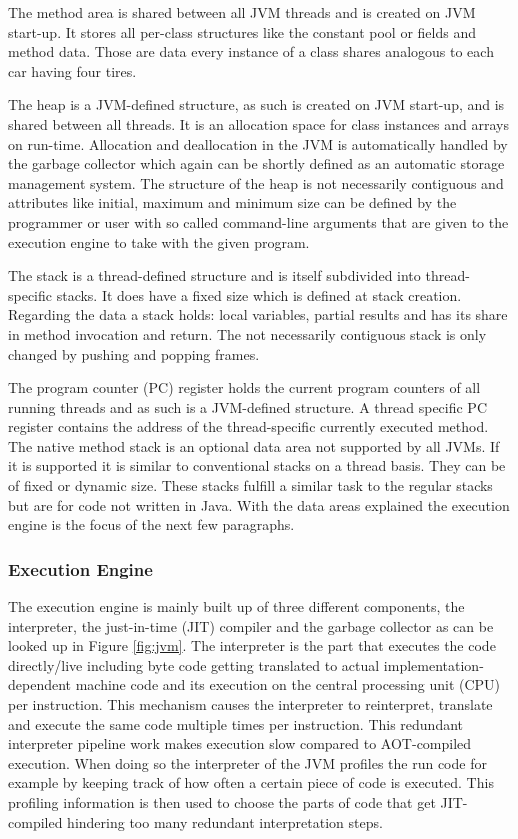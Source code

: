 The method area is shared between all JVM threads and is created on JVM start-up. It stores all per-class structures like the constant pool or fields and method data. Those are data every instance of a class shares analogous to each car having four tires.

The heap is a JVM-defined structure, as such is created on JVM start-up, and is shared between all threads. It is an allocation space for class instances and arrays on run-time. Allocation and deallocation in the JVM is automatically handled by the garbage collector which again can be shortly defined as an automatic storage management system. The structure of the heap is not necessarily contiguous and attributes like initial, maximum and minimum size can be defined by the programmer or user with so called command-line arguments that are given to the execution engine to take with the given program.

The stack is a thread-defined structure and is itself subdivided into thread-specific stacks. It does have a fixed size which is defined at stack creation. Regarding the data a stack holds: local variables, partial results and has its share in method invocation and return. The not necessarily contiguous stack is only changed by pushing and popping frames.

The program counter (PC) register holds the current program counters of all running threads and as such is a JVM-defined structure. A thread specific PC register contains the address of the thread-specific currently executed method.
The native method stack is an optional data area not supported by all JVMs. If it is supported it is similar to conventional stacks on a thread basis. They can be of fixed or dynamic size. These stacks fulfill a similar task to the regular stacks but are for code not written in Java. With the data areas explained the execution engine is the focus of the next few paragraphs.

\subsubsection{Execution Engine}

The execution engine is mainly built up of three different components, the interpreter, the just-in-time (JIT) compiler and the garbage collector as can be looked up in Figure \ref{fig:jvm}. The interpreter is the part that executes the code directly/live including byte code getting translated to actual implementation-dependent machine code and its execution on the central processing unit (CPU) per instruction. This mechanism causes the interpreter to reinterpret, translate and execute the same code multiple times per instruction. This redundant interpreter pipeline work makes execution slow compared to AOT-compiled execution. When doing so the interpreter of the JVM profiles the run code for example by keeping track of how often a certain piece of code is executed. This profiling information is then used to choose the parts of code that get JIT-compiled hindering too many redundant interpretation steps.

